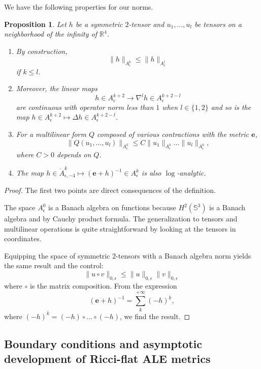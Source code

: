 \documentclass[12pt]{article}
\newtheorem{prop}[thm]{Proposition}
\begin{document}
    We have the following properties for our norms. 
    \begin{prop}\label{properties A epsilon k}
    Let $h$ be a symmetric $2$-tensor and $u_1,...,u_l$ be tensors on a neighborhood of the infinity of $\mathbb{R}^4$. 
    \begin{enumerate}
        \item By construction,
    $$\|h\|_{A_\epsilon^k}\leqslant \|h\|_{A_\epsilon^l}$$
    if $k\leqslant l$. 
    \item Moreover, the linear maps
    $$ h\in A^{k+2}_\epsilon\to \nabla^lh\in A^{k+2-l}_\epsilon $$
    are continuous with operator norm less than $1$ when $l\in \{1,2\}$ and so is the map $ h\in A^{k+2}_\epsilon\mapsto \Delta h \in A^{k+2-l}_\epsilon$. 
    \item For a multilinear form $Q$ composed of various contractions with the metric $\mathbf{e}$,
    $$ \|Q(u_1,...,u_l)\|_{A^{k}_\epsilon} \leqslant C\|u_1\|_{A^{k}_\epsilon}\ldots \|u_l\|_{A^{k}_\epsilon},$$ where $C>0$ depends on $Q$.
    \item The map $h\in \mathring{A}_{\epsilon,-4}^k\mapsto(\mathbf{e}+h)^{-1}\in A_\epsilon^k$ is also $\log$-analytic. 
    \end{enumerate}
    \end{prop}
    \begin{proof}
        The first two points are direct consequences of the definition.
        
        The space $A^0_\epsilon$ is a Banach algebra on functions because $H^2(\mathbb{S}^3)$ is a Banach algebra and by Cauchy product formula. The generalization to tensors and multilinear operations is quite straightforward by looking at the tensors in coordinates. 
        
        Equipping the space of symmetric $2$-tensors with a Banach algebra norm yields the same result and the control:
        $$ \|u\circ v\|_{0,\epsilon}\leqslant \|u\|_{0,\epsilon}\|v\|_{0,\epsilon}$$
        where $\circ$ is the matrix composition. From the expression
        $$ (\mathbf{e}+h)^{-1} = \sum_{k}^{+\infty}(-h)^k, $$
        where $(-h)^k = (-h)\circ\ldots\circ(-h)$, we find the result.
    \end{proof}
    
    \subsection{Boundary conditions and asymptotic development of Ricci-flat ALE metrics}
    
\end{document}
